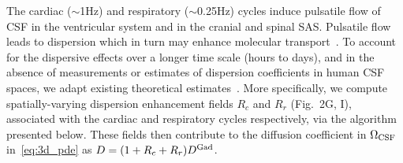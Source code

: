 \documentclass[fleqn,10pt]{wlscirep}
\begin{document}
The cardiac ($\sim$1Hz) and respiratory ($\sim$0.25Hz) cycles induce
pulsatile flow of CSF in the ventricular system and in the cranial and
spinal SAS. Pulsatile flow leads to dispersion which in turn may
enhance molecular transport~\cite{taylor1953dispersion,
  watson1983diffusion, asgari2016glymphatic, sharp2019dispersion,
  ray2021quantitative, troyetsky2021dispersion}. To account for the
dispersive effects over a longer time scale (hours to days), and in
the absence of measurements or estimates of dispersion coefficients in
human CSF spaces, we adapt existing theoretical
estimates~\cite{watson1983diffusion, sharp2019dispersion}. More
specifically, we compute spatially-varying dispersion enhancement
fields $R_c$ and $R_r$ (Fig.~2G, I), associated with the
cardiac and respiratory cycles respectively, via the algorithm
presented below. These fields then contribute to the diffusion
coefficient in $\Omega_{\rm CSF}$ in~\eqref{eq:3d_pde} as $D = (1 +
R_c + R_r) D^{\rm Gad}$.
\end{document}
